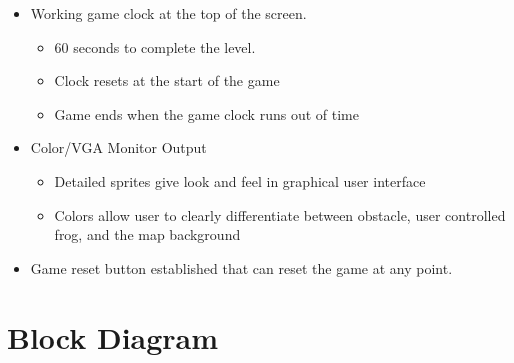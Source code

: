 \documentclass[journal, twocolumn, final,11pt,letterpaper]{IEEEtran}
\begin{document}
\begin{itemize}
	\item Working game clock at the top of the screen.
		\begin{itemize}
			\item 60 seconds to complete the level.
			\item Clock resets at the start of the game
			\item Game ends when the game clock runs out of time
		\end{itemize} 
	\item Color/VGA Monitor Output
	\begin{itemize}
		\item Detailed sprites give look and feel in graphical user interface
		\item Colors allow user to clearly differentiate between obstacle, user controlled frog, and the map background
	\end{itemize}
	\item Game reset button established that can reset the game at any point.
\end{itemize}

%

\section{Block Diagram} 
 
\end{document}
